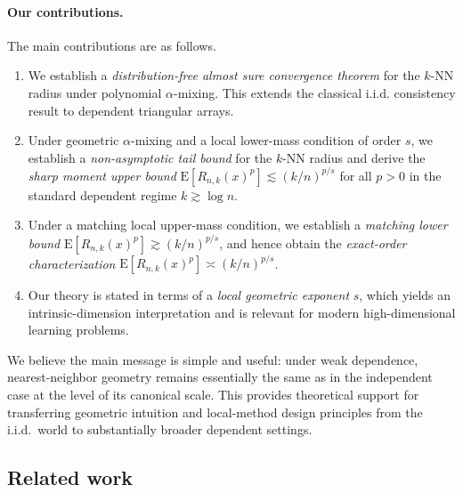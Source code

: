 \documentclass[12pt]{article}
\def\E{{\mathrm E}}
\theoremstyle{definition}
\begin{document}
\paragraph*{Our contributions.}
The main contributions are as follows.
\begin{enumerate}
    \item We establish a \emph{distribution-free almost sure convergence theorem} for the $k$-NN radius under polynomial $\alpha$-mixing. This extends the classical i.i.d. consistency result to dependent triangular arrays.

    \item Under geometric $\alpha$-mixing and a local lower-mass condition of order $s$, we establish a \emph{non-asymptotic tail bound} for the $k$-NN radius and derive the \emph{sharp moment upper bound} $\E[R_{n,k}(x)^p] \lesssim (k/n)^{p/s}$ for all $p>0$ in the standard dependent regime $k \gtrsim \log n$.

    \item Under a matching local upper-mass condition, we establish a \emph{matching lower bound} $\E[R_{n,k}(x)^p] \gtrsim (k/n)^{p/s}$, and hence obtain the \emph{exact-order characterization} $\E[R_{n,k}(x)^p] \asymp (k/n)^{p/s}$.

    \item Our theory is stated in terms of a \emph{local geometric exponent} $s$, which yields an intrinsic-dimension interpretation and is relevant for modern high-dimensional learning problems.
\end{enumerate}

We believe the main message is simple and useful: under weak dependence, nearest-neighbor geometry remains essentially the same as in the independent case at the level of its canonical scale. This provides theoretical support for transferring geometric intuition and local-method design principles from the i.i.d.\ world to substantially broader dependent settings.

\subsection{Related work}
\label{sec:related}
\end{document}
